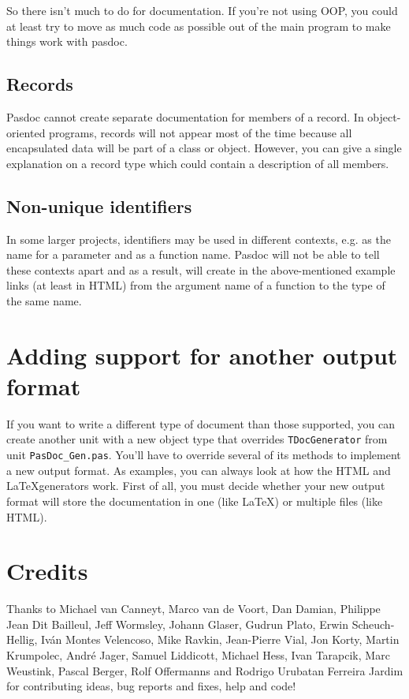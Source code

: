\documentclass[11pt]{article}
\begin{document}
So there isn't much to do for documentation.
If you're not using OOP, you could at least try to move as much code
as possible out of the main program to make things work with pasdoc.

\subsection{Records}

Pasdoc cannot create separate documentation for members of a record.
In object-oriented programs, records will not appear most of the time
because all encapsulated data will be part of a class or object.
However, you can give a single explanation on a record type which
could contain a description of all members.

\subsection{Non-unique identifiers}

In some larger projects, identifiers may be used in different contexts,
e.g. as the name for a parameter and as a function name.
Pasdoc will not be able to tell these contexts apart and as a result,
will create in the above-mentioned example links (at least in HTML)
from the argument name of a function to the type of the same name.

\section{Adding support for another output format}

If you want to write a different type of document than those supported,
you can create another unit with a new object type that overrides
{\tt TDocGenerator} from unit {\tt PasDoc\_Gen.pas}.
You'll have to override several of its methods to implement a new 
output format.
As examples, you can always look at how the HTML and \LaTeX generators
work.
First of all, you must decide whether your new output format will 
store the documentation in one (like \LaTeX) or multiple files 
(like HTML).


\section{Credits}

Thanks to Michael van Canneyt, Marco van de Voort, Dan Damian, Philippe
Jean Dit Bailleul, Jeff Wormsley, Johann Glaser, Gudrun Plato, Erwin
Scheuch-Hellig, Iv\'{a}n Montes Velencoso, Mike Ravkin, Jean-Pierre Vial,
Jon Korty, Martin Krumpolec, Andr\'{e} Jager, Samuel Liddicott, Michael
Hess, Ivan Tarapcik, Marc Weustink, Pascal Berger, Rolf Offermanns and
Rodrigo Urubatan Ferreira Jardim for contributing ideas, bug reports and
fixes, help and code!
\end{document}
